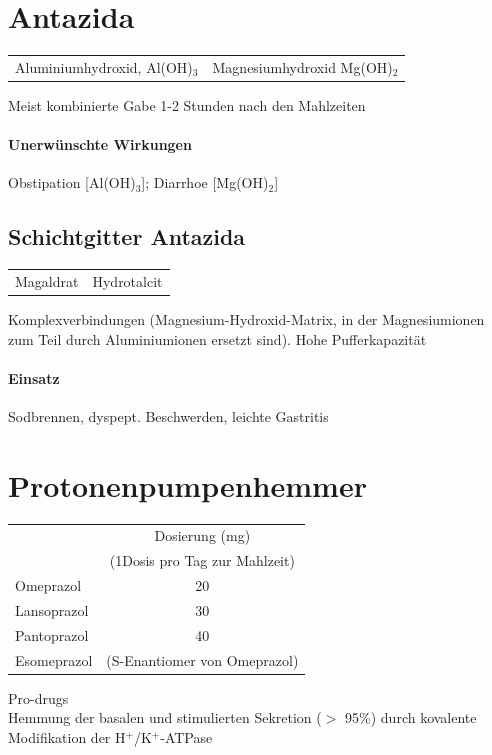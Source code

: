 \documentclass[10pt,a4paper]{report}
\begin{document}
\section{Antazida} %
\label{sec:antiazida}
\begin{tabularx}{\textwidth}{XX}
Aluminiumhydroxid, Al(OH)$_3$&Magnesiumhydroxid Mg(OH)$_2$\\
\end{tabularx}
Meist kombinierte Gabe 1-2 Stunden nach den Mahlzeiten 
\paragraph{Unerwünschte Wirkungen} %
\label{ssub:unerw_nschte_wirkungen}
Obstipation [Al(OH)$_3$]; Diarrhoe [Mg(OH)$_2$]
\subsection{Schichtgitter Antazida} %
\label{sub:schichtgitter_antazida}
\begin{tabularx}{\textwidth}{XX}
Magaldrat&Hydrotalcit\\
\end{tabularx}
Komplexverbindungen (Magnesium-Hydroxid-Matrix, in der  Magnesiumionen zum Teil durch Aluminiumionen ersetzt sind). Hohe Pufferkapazität
\paragraph{Einsatz} %
\label{par:einsatz}
Sodbrennen, dyspept. Beschwerden, leichte Gastritis
\section{Protonenpumpenhemmer} %
\label{sec:protonenpumpenhemmer}
\begin{tabularx}{\textwidth}{lc}
&Dosierung (mg)\\
&(1Dosis pro Tag zur Mahlzeit)\\
Omeprazol&20\\
Lansoprazol&30\\ 
Pantoprazol&40\\
Esomeprazol&(S-Enantiomer von Omeprazol)\\
\end{tabularx}
Pro-drugs\\
Hemmung der basalen und stimulierten 
Sekretion ($>$ 95\%) durch kovalente Modifikation 
der H$^+$/K$^+$-ATPase
\end{document}
